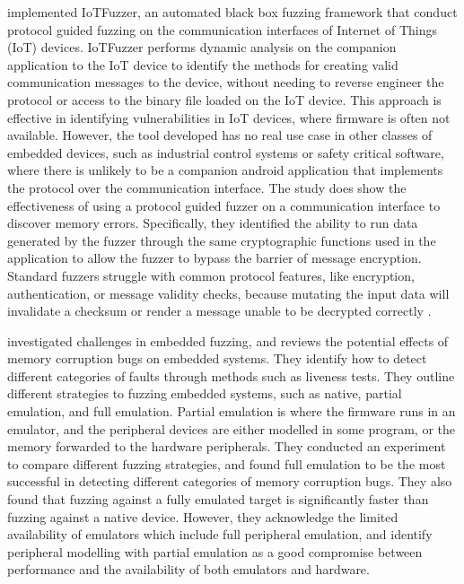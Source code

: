 \documentclass[../report.tex]{subfiles}
\begin{document}
\citet{IOTFuzzer_2018} implemented IoTFuzzer, an automated black box fuzzing
framework that conduct protocol guided fuzzing on the communication interfaces
of Internet of Things (IoT) devices. IoTFuzzer performs dynamic analysis on the companion
application to the IoT device to identify the methods for creating valid
communication messages to the device, without needing to reverse engineer the
protocol or access to the binary file loaded on the IoT device. This approach
is effective in identifying vulnerabilities in IoT devices, where firmware is
often not available. However, the tool developed has no real use case in other
classes of embedded devices, such as industrial control systems or safety
critical software, where there is unlikely to be a companion android
application that implements the protocol over the communication interface.
The study does show the effectiveness of using a protocol guided
fuzzer on a communication interface to discover memory errors. Specifically,
they identified the ability to run data generated by the fuzzer through the same
cryptographic functions used in the application to allow the fuzzer to bypass
the barrier of message encryption. Standard fuzzers struggle with common
protocol features, like encryption, authentication, or message validity checks,
because mutating the input data will invalidate a checksum or render a message
unable to be decrypted correctly \citep{Fuzztruction_2023}.

\citet{Muench_2018} investigated challenges in embedded fuzzing, and reviews
the potential effects of memory corruption bugs on embedded systems.
They identify how to detect different categories of faults through methods such
as liveness tests. They outline different strategies to fuzzing embedded
systems, such as native, partial emulation, and full emulation. Partial
emulation is where the firmware runs in an emulator, and the peripheral devices
are either modelled in some program, or the memory forwarded to the hardware
peripherals. They conducted an experiment to compare different fuzzing
strategies, and found full emulation to be the most successful in detecting
different categories of memory corruption bugs. They also found that fuzzing
against a fully emulated target is significantly faster than fuzzing against a
native device. However, they acknowledge the limited availability of emulators
which include full peripheral emulation, and identify peripheral modelling with
partial emulation as a good compromise between performance and the availability
of both emulators and hardware.
\end{document}
